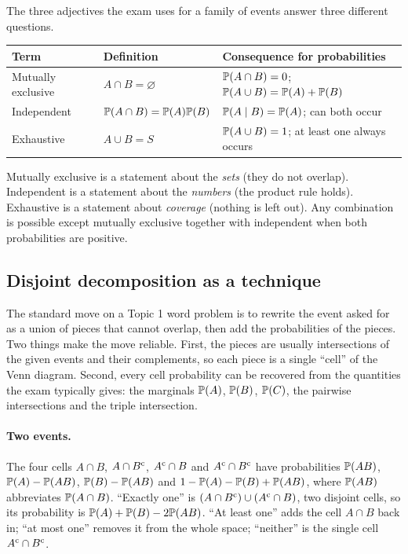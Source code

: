 The three adjectives the exam uses for a family of events answer three different questions.

\begin{center}
\begin{tabular}{@{}lll@{}}
\toprule
Term & Definition & Consequence for probabilities \\
\midrule
Mutually exclusive & $A \cap B = \varnothing$ & $\mathbb{P}(A \cap B) = 0$; $\mathbb{P}(A \cup B) = \mathbb{P}(A) + \mathbb{P}(B)$ \\
Independent & $\mathbb{P}(A \cap B) = \mathbb{P}(A)\mathbb{P}(B)$ & $\mathbb{P}(A \mid B) = \mathbb{P}(A)$; can both occur \\
Exhaustive & $A \cup B = S$ & $\mathbb{P}(A \cup B) = 1$; at least one always occurs \\
\bottomrule
\end{tabular}
\end{center}

Mutually exclusive is a statement about the \emph{sets} (they do not overlap). Independent
is a statement about the \emph{numbers} (the product rule holds). Exhaustive is a statement
about \emph{coverage} (nothing is left out). Any combination is possible except mutually
exclusive together with independent when both probabilities are positive.

\subsection{Disjoint decomposition as a technique}

The standard move on a Topic 1 word problem is to rewrite the event asked for as a union of
pieces that cannot overlap, then add the probabilities of the pieces. Two things make the
move reliable. First, the pieces are usually intersections of the given events and their
complements, so each piece is a single ``cell'' of the Venn diagram. Second, every cell
probability can be recovered from the quantities the exam typically gives: the marginals
$\mathbb{P}(A)$, $\mathbb{P}(B)$, $\mathbb{P}(C)$, the pairwise intersections and the triple intersection.

\paragraph{Two events.} The four cells $A \cap B$, $A \cap B^{\mathrm{c}}$, $A^{\mathrm{c}} \cap B$ and
$A^{\mathrm{c}} \cap B^{\mathrm{c}}$ have probabilities $\mathbb{P}(AB)$, $\mathbb{P}(A) - \mathbb{P}(AB)$,
$\mathbb{P}(B) - \mathbb{P}(AB)$ and $1 - \mathbb{P}(A) - \mathbb{P}(B) + \mathbb{P}(AB)$, where $\mathbb{P}(AB)$
abbreviates $\mathbb{P}(A \cap B)$. ``Exactly one'' is $(A \cap B^{\mathrm{c}}) \cup (A^{\mathrm{c}} \cap B)$,
two disjoint cells, so its probability is $\mathbb{P}(A) + \mathbb{P}(B) - 2\mathbb{P}(AB)$. ``At least
one'' adds the cell $A \cap B$ back in; ``at most one'' removes it from the whole space;
``neither'' is the single cell $A^{\mathrm{c}} \cap B^{\mathrm{c}}$.

